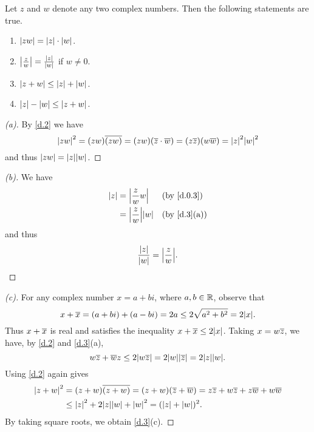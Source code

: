\begin{thm}\label{d.3}
  Let \(z\) and \(w\) denote any two complex numbers.
  Then the following statements are true.
  \begin{enumerate}
    \item \(\left\lvert zw\right\rvert = \left\lvert z\right\rvert \cdot \left\lvert w\right\rvert\).
    \item \(\left\lvert\frac{z}{w}\right\rvert = \frac{\left\lvert z\right\rvert}{\left\lvert w\right\rvert}\) if \(w \neq 0\).
    \item \(\left\lvert z + w\right\rvert \leq \left\lvert z\right\rvert + \left\lvert w\right\rvert\).
    \item \(\left\lvert z\right\rvert - \left\lvert w\right\rvert \leq \left\lvert z + w\right\rvert\).
  \end{enumerate}
\end{thm}

\begin{proof}[(a)]
  By \cref{d.2} we have
  \[
    \abs{zw}^2 = (zw) \conj{(zw)} = (zw) (\conj{z} \cdot \conj{w}) = (z \conj{z}) (w \conj{w}) = \abs{z}^2 \abs{w}^2
  \]
  and thus \(\abs{zw} = \abs{z} \abs{w}\).
\end{proof}

\begin{proof}[(b)]
  We have
  \begin{align*}
    \abs{z} & = \abs{\frac{z}{w} w}       &  & \text{(by \cref{d.0.3})}  \\
            & = \abs{\frac{z}{w}} \abs{w} &  & \text{(by \cref{d.3}(a))}
  \end{align*}
  and thus
  \[
    \frac{\abs{z}}{\abs{w}} = \abs{\frac{z}{w}}.
  \]
\end{proof}

\begin{proof}[(c)]
  For any complex number \(x = a + bi\), where \(a, b \in \mathbb{R}\), observe that
  \[
    x + \conj{x} = (a + bi) + (a - bi) = 2a \leq 2 \sqrt{a^2 + b^2} = 2 \abs{x}.
  \]
  Thus \(x + \overline{x}\) is real and satisfies the inequality \(x + \conj{x} \leq 2 \abs{x}\).
  Taking \(x = w \overline{z}\), we have, by \cref{d.2} and \cref{d.3}(a),
  \[
    w \conj{z} + \conj{w} z \leq 2 \abs{w \conj{z}} = 2 \abs{w} \abs{\conj{z}} = 2 \abs{z} \abs{w}.
  \]
  Using \cref{d.2} again gives
  \begin{align*}
    \abs{z + w}^2 & = (z + w) \conj{(z + w)} = (z + w) (\conj{z} + \conj{w}) = z \conj{z} + w \conj{z} + z \conj{w} + w \conj{w} \\
                  & \leq \abs{z}^2 + 2 \abs{z} \abs{w} + \abs{w}^2 = (\abs{z} + \abs{w})^2.
  \end{align*}
  By taking square roots, we obtain \cref{d.3}(c).
\end{proof}

